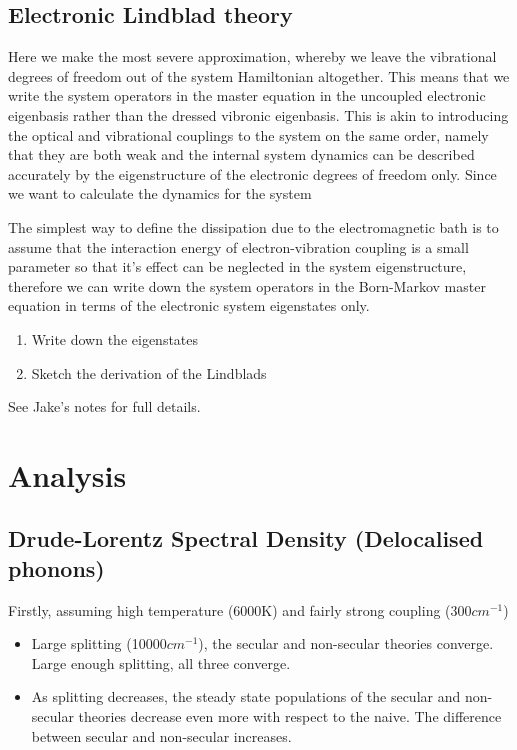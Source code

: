 \documentclass[]{article}
\begin{document}
\subsection{Electronic Lindblad theory}
\label{ssec:electronic}
Here we make the most severe approximation, whereby we leave the vibrational degrees of freedom out of the system Hamiltonian altogether. This means that we write the system operators in the master equation in the uncoupled electronic eigenbasis rather than the dressed vibronic eigenbasis. This is akin to introducing the optical and vibrational couplings to the system on the same order, namely that they are both weak and the internal system dynamics can be described accurately by the eigenstructure of the electronic degrees of freedom only. Since we want to calculate the dynamics for the system 

The simplest way to define the dissipation due to the electromagnetic bath is to assume that the interaction energy of electron-vibration coupling is a small parameter so that it's effect can be neglected in the system eigenstructure, therefore we can write down the system operators in the Born-Markov master equation in terms of the electronic system eigenstates only.
\begin{enumerate}
	\item Write down the eigenstates
	\item Sketch the derivation of the Lindblads
\end{enumerate}
See Jake's notes for full details.
\pagebreak
\section{Analysis}
\subsection{Drude-Lorentz Spectral Density (Delocalised phonons)}
Firstly, assuming high temperature (6000K) and fairly strong coupling (300$cm^{-1}$)
\begin{itemize}
	\item Large splitting (10000$cm^{-1}$), the secular and non-secular theories converge. Large enough splitting, all three converge.
	\item As splitting decreases, the steady state populations of the secular and non-secular theories decrease even more with respect to the naive. The difference between secular and non-secular increases.
\end{itemize}
\end{document}
